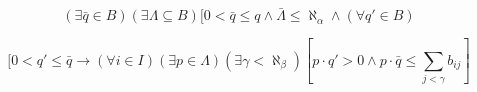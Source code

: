 $$(\exists \bar{q} \in B)(\exists \Lambda \subseteq B)[0 < \bar{q} \leq q \wedge \bar{\Lambda} \leq \aleph_\alpha \wedge (\forall q' \in B)$$

$$[0 < q' \leq \bar{q} \rightarrow (\forall i \in I)(\exists p \in \Lambda)(\exists \gamma < \aleph_\beta)[p \cdot q' > 0 \wedge p \cdot \bar{q} \leq \sum_{j < \gamma} b_{ij}]$$
